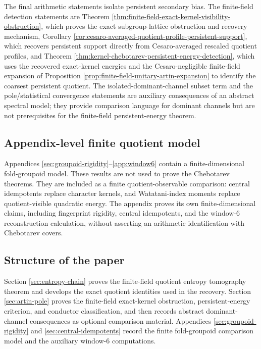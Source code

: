 The final arithmetic statements isolate persistent secondary bias. The finite-field detection statements are Theorem \ref{thm:finite-field-exact-kernel-visibility-obstruction}, which proves the exact subgroup-lattice obstruction and recovery mechanism, Corollary \ref{cor:cesaro-averaged-quotient-profile-persistent-support}, which recovers persistent support directly from Cesaro-averaged rescaled quotient profiles, and Theorem \ref{thm:kernel-chebotarev-persistent-energy-detection}, which uses the recovered exact-kernel energies and the Cesaro-negligible finite-field expansion of Proposition \ref{prop:finite-field-unitary-artin-expansion} to identify the coarsest persistent quotient. The isolated-dominant-channel subset term and the pole/statistical convergence statements are auxiliary consequences of an abstract spectral model; they provide comparison language for dominant channels but are not prerequisites for the finite-field persistent-energy theorem.

\subsection{Appendix-level finite quotient model}
Appendices \ref{sec:groupoid-rigidity}--\ref{app:window6} contain a finite-dimensional fold-groupoid model. These results are not used to prove the Chebotarev theorems. They are included as a finite quotient-observable comparison: central idempotents replace character kernels, and Watatani-index moments replace quotient-visible quadratic energy. The appendix proves its own finite-dimensional claims, including fingerprint rigidity, central idempotents, and the window-\(6\) reconstruction calculation, without asserting an arithmetic identification with Chebotarev covers.

\subsection{Structure of the paper}
Section \ref{sec:entropy-chain} proves the finite-field quotient entropy tomography theorem and develops the exact quotient identities used in the recovery. Section \ref{sec:artin-pole} proves the finite-field exact-kernel obstruction, persistent-energy criterion, and conductor classification, and then records abstract dominant-channel consequences as optional comparison material. Appendices \ref{sec:groupoid-rigidity} and \ref{sec:central-idempotents} record the finite fold-groupoid comparison model and the auxiliary window-\(6\) computations.

\endinput
